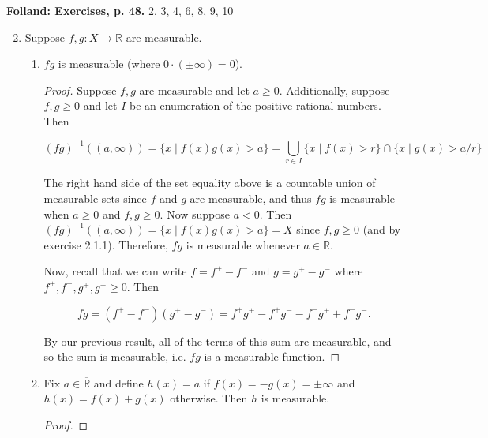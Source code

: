\documentclass[11pt,oneside,english]{amsart}
\theoremstyle{definition}
\newcommand{\R}{\mathbb{R}}
\begin{document}
\rightline{\today}


\textbf{Folland: Exercises, p. 48.} 2, 3, 4, 6, 8, 9, 10

\vspace{1cm}
\begin{enumerate}
\setcounter{enumi}{1}


\item Suppose $f,g:X\rightarrow \overline{\R}$ are measurable.

\begin{enumerate}
\item $fg$ is measurable (where $0\cdot(\pm\infty)=0$).

\begin{proof}
Suppose $f,g$ are measurable and let $a\geq0$. Additionally, suppose $f,g\geq0$ and let $I$ be an enumeration of the positive rational numbers. Then

\[
(fg)^{-1}((a,\infty))=\{x\mid f(x)g(x)>a\}=\bigcup_{r\in I}\{x\mid f(x)>r\}\cap\{x\mid g(x)>a/r\}
\]

The right hand side of the set equality above is a countable union of measurable sets since $f$ and $g$ are measurable, and thus $fg$ is measurable when $a\geq0$ and $f,g\geq0$. Now suppose $a<0$. Then $(fg)^{-1}((a,\infty))=\{x\mid f(x)g(x)>a\}=X$ since $f,g\geq0$ (and by exercise 2.1.1). Therefore, $fg$ is measurable whenever $a\in\R$.

Now, recall that we can write $f=f^+-f^-$ and $g=g^+-g^-$ where $f^+,f^-,g^+,g^-\geq0$. Then

\[
fg=(f^+-f^-)(g^+-g^-)=f^+g^+-f^+g^--f^-g^++f^-g^-.
\]

By our previous result, all of the terms of this sum are measurable, and so the sum is measurable, i.e. $fg$ is a measurable function.
\end{proof}

\pagebreak

\item Fix $a\in\overline{\R}$ and define $h(x)=a$ if $f(x)=-g(x)=\pm\infty$ and $h(x)=f(x)+g(x)$ otherwise. Then $h$ is measurable.

\begin{proof}


%


\end{proof}
\end{enumerate}
\end{enumerate}
\end{document}
